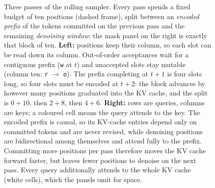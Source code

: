\begin{figure}[tbp]
\caption{Three passes of the rolling sampler.  Every pass spends a fixed
budget of ten positions (dashed frame), split between an \emph{encoded
prefix} of the tokens committed on the previous pass and the remaining
\emph{denoising window}; the mask panel on the right is exactly that block of
ten.  \textbf{Left:} positions keep their column, so each slot can be read down
its column.  Out-of-order acceptances wait for a contiguous prefix (\texttt{w}
at $t$) and unaccepted slots stay mutable (column ten: \texttt{r} $\to$
\texttt{o}).  The prefix completing at $t{+}1$ is four slots long, so four
slots must be encoded at $t{+}2$: the block advances by however many positions
graduated into the KV cache, and the split is $0{+}10$, then $2{+}8$, then
$4{+}6$.  \textbf{Right:} rows are queries, columns are keys; a coloured cell
means the query attends to the key.  The encoded prefix is causal, so its
KV-cache entries depend only on committed tokens and are never revised, while
denoising positions are bidirectional among themselves and attend fully to the
prefix.  Committing more positions per pass therefore moves the KV cache forward
faster, but leaves fewer positions to denoise on the next pass.  Every query additionally attends to the
whole KV cache (white cells), which the panels omit for space.}
\label{fig:algorithm-concept}
\end{figure}
